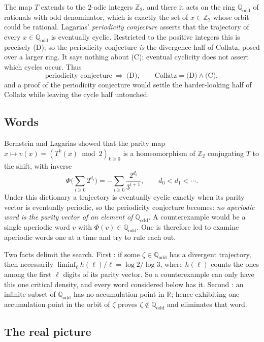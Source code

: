 \documentclass[11pt,a4paper]{article}
\theoremstyle{plain}
\theoremstyle{definition}
\newcommand{\R}{\mathbb{R}}
\newcommand{\Z}{\mathbb{Z}}
\newcommand{\Qodd}{\mathbb{Q}_{\mathrm{odd}}}
\begin{document}
The map $T$ extends to the $2$-adic integers $\Z_2$, and there it acts on the ring $\Qodd$ of
rationals with odd denominator, which is exactly the set of $x\in\Z_2$ whose orbit could be
rational. Lagarias' \emph{periodicity conjecture} asserts that the trajectory of every $x\in\Qodd$
is eventually cyclic. Restricted to the positive integers this is precisely (D); so the periodicity
conjecture \emph{is} the divergence half of Collatz, posed over a larger ring. It says nothing about
(C): eventual cyclicity does not assert which cycles occur. Thus
\[
   \text{periodicity conjecture}\ \Longrightarrow\ \text{(D)},
   \qquad
   \text{Collatz}=\text{(D)}\wedge\text{(C)} ,
\]
and a proof of the periodicity conjecture would settle the harder-looking half of Collatz while
leaving the cycle half untouched.

\subsection*{Words}

Bernstein and Lagarias \cite{BL} showed that the parity map $x\mapsto v(x)=(T^k(x)\bmod2)_{k\ge0}$
is a homeomorphism of $\Z_2$ conjugating $T$ to the shift, with inverse
\begin{equation}\label{eq:Phi}
   \Phi\Big(\sum_{i\ge0}2^{d_i}\Big)=-\sum_{i\ge0}\frac{2^{d_i}}{3^{i+1}},
   \qquad d_0<d_1<\cdots .
\end{equation}
Under this dictionary a trajectory is eventually cyclic exactly when its parity vector is eventually
periodic, so the periodicity conjecture becomes: \emph{no aperiodic word is the parity vector of an
element of $\Qodd$}. A counterexample would be a single aperiodic word $v$ with $\Phi(v)\in\Qodd$.
One is therefore led to examine aperiodic words one at a time and try to rule each out.

Two facts delimit the search. First \cite[Theorem 1]{LS}: if some $\zeta\in\Qodd$ has a divergent
trajectory, then necessarily $\liminf_\ell h(\ell)/\ell=\log2/\log3$, where $h(\ell)$ counts the
ones among the first $\ell$ digits of its parity vector. So a counterexample can only have this one
critical density, and every word considered below has it. Second \cite[p.~3]{LS}: an infinite subset
of $\Qodd$ has no accumulation point in $\R$; hence exhibiting one accumulation point in the orbit
of $\zeta$ proves $\zeta\notin\Qodd$ and eliminates that word.

\subsection*{The real picture}
\end{document}

